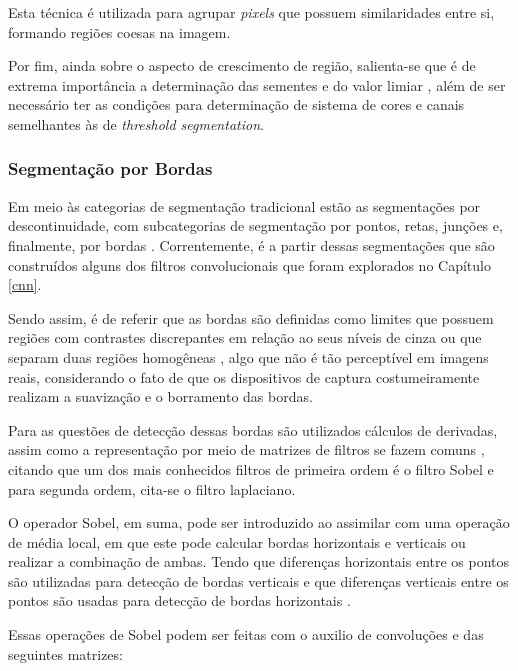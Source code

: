 Esta técnica é utilizada para agrupar \textit{pixels} que possuem similaridades entre si, formando regiões coesas na imagem.

Por fim, ainda sobre o aspecto de crescimento de região, salienta-se que é de extrema importância a determinação das sementes e do valor limiar \citep{Yuheng2017, pedrini2008analise}, além de ser necessário ter as condições para determinação de sistema de cores e canais semelhantes às de \textit{threshold segmentation}.


\subsubsection{Segmentação por Bordas}
\label{segment:limit}

Em meio às categorias de segmentação tradicional estão as segmentações por descontinuidade, com subcategorias de segmentação por pontos, retas, junções e, finalmente, por bordas \citep{pedrini2008analise}. Correntemente, é a partir dessas segmentações que são construídos alguns dos filtros convolucionais que foram explorados no Capítulo \ref{cnn}.

Sendo assim, é de referir que as bordas são definidas como limites que possuem regiões com contrastes discrepantes em relação ao seus níveis de cinza  ou que separam duas regiões homogêneas \citep{pedrini2008analise,Yuheng2017}, algo que não é tão perceptível em imagens reais, considerando o fato de que os dispositivos de captura costumeiramente realizam a suavização e o borramento das bordas.

Para as questões de detecção dessas bordas são utilizados cálculos de derivadas, assim  como a representação por meio de matrizes de filtros se fazem comuns \citep{pedrini2008analise, muthukrishnan2011edge}, citando que um dos mais conhecidos filtros de primeira ordem é o filtro Sobel e para segunda ordem, cita-se o filtro laplaciano.

O operador Sobel, em suma, pode ser introduzido ao assimilar com uma operação de média local, em que este pode calcular bordas horizontais e verticais ou realizar a combinação de ambas. Tendo que diferenças horizontais entre os pontos são utilizadas para detecção de bordas verticais e que diferenças verticais entre os pontos são usadas para detecção de bordas horizontais \citep{pedrini2008analise}.

Essas operações de Sobel podem ser feitas com o auxilio de convoluções e das seguintes matrizes:

